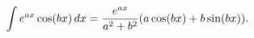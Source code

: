 \[\int e^{ax}\mathop{\cos\/}\nolimits\!\left(bx\right)dx=\frac{e^{ax}}{a^{2}+b^{%
2}}(a\mathop{\cos\/}\nolimits\!\left(bx\right)+b\mathop{\sin\/}\nolimits\!%
\left(bx\right)).\]